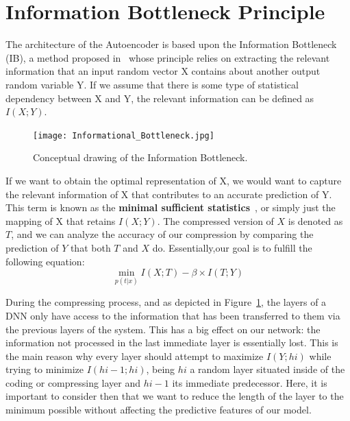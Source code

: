 \section{Information Bottleneck Principle}


The architecture of the Autoencoder is based upon the  Information Bottleneck (IB), a method proposed in~\cite{Inf_Bottleneck_first} whose principle relies on extracting the relevant information that an input random vector X contains about another output random variable Y. If we assume that there is some type of statistical dependency between X and Y, the relevant information can be defined as $I(X;Y)$.\par
%
\begin{figure}[H]
	\centering
	\texttt{[image: Informational\_Bottleneck.jpg]}
	\caption{Conceptual drawing of the Information Bottleneck.}
	\label{fig:figure_info_bottle}
\end{figure} 

If we want to obtain the optimal representation of X, we would want to capture the relevant information of X that contributes to an accurate prediction of Y. This term is known as the \textbf{minimal sufficient statistics}~\cite{citationToThis}, or simply just the mapping of X that retains $I(X;Y)$. The compressed version of $X$ is denoted as $T$, and we can analyze the accuracy of our compression by comparing the prediction of $Y$ that both $T$ and $X$ do. Essentially,our goal is to fulfill the following equation: %
%
\begin{equation}
\label{eq:Bottleneck_equation}
\min\limits_{p(t|x)}  I(X;T) - \beta \times I(T;Y)
\end{equation} \newline

During the compressing process, and as depicted in Figure~\ref{fig:figure_info_bottle}, the layers of a DNN only have access to the information that has been transferred to them via the previous layers of the system. This has a big effect on our network: the information not processed in the last immediate layer is essentially lost. This is the main reason why every layer should attempt to maximize $I(Y;hi)$ while trying to minimize $I(hi-1;hi)$, being $hi$ a random layer situated inside of the coding or compressing layer and $hi-1$ its immediate predecessor. Here, it is important to consider then that we want to reduce the length of the layer to the minimum possible without affecting the predictive features of our model. \par

